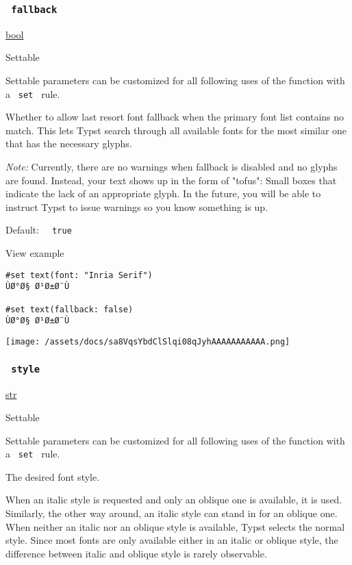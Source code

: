 \subsubsection{\texorpdfstring{\texttt{\ fallback\ }}{ fallback }}\label{parameters-fallback}

\href{/docs/reference/foundations/bool/}{bool}

{{ Settable }}

\label{parameters-fallback-settable-tooltip}
Settable parameters can be customized for all following uses of the
function with a \texttt{\ set\ } rule.

Whether to allow last resort font fallback when the primary font list
contains no match. This lets Typst search through all available fonts
for the most similar one that has the necessary glyphs.

\emph{Note:} Currently, there are no warnings when fallback is disabled
and no glyphs are found. Instead, your text shows up in the form of
"tofus": Small boxes that indicate the lack of an appropriate glyph. In
the future, you will be able to instruct Typst to issue warnings so you
know something is up.

Default: \texttt{\ }{\texttt{\ true\ }}\texttt{\ }


View example

\begin{verbatim}
#set text(font: "Inria Serif")
ÙØ°Ø§ Ø¹Ø±Ø¨Ù

#set text(fallback: false)
ÙØ°Ø§ Ø¹Ø±Ø¨Ù
\end{verbatim}

\texttt{[image: /assets/docs/sa8VqsYbdClSlqi08qJyhAAAAAAAAAAA.png]}

\subsubsection{\texorpdfstring{\texttt{\ style\ }}{ style }}\label{parameters-style}

\href{/docs/reference/foundations/str/}{str}

{{ Settable }}

\label{parameters-style-settable-tooltip}
Settable parameters can be customized for all following uses of the
function with a \texttt{\ set\ } rule.

The desired font style.

When an italic style is requested and only an oblique one is available,
it is used. Similarly, the other way around, an italic style can stand
in for an oblique one. When neither an italic nor an oblique style is
available, Typst selects the normal style. Since most fonts are only
available either in an italic or oblique style, the difference between
italic and oblique style is rarely observable.

